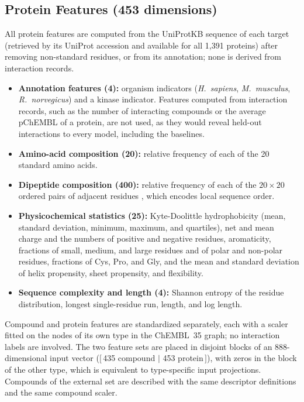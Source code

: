 \documentclass[11pt,letterpaper]{article}
\begin{document}
\subsection*{Protein Features (453 dimensions)}
All protein features are computed from the UniProtKB sequence of each target (retrieved by its UniProt accession and available for all 1{,}391 proteins) after removing non-standard residues, or from its annotation; none is derived from interaction records.
\begin{itemize}
    \item \textbf{Annotation features (4):} organism indicators (\textit{H.~sapiens}, \textit{M.~musculus}, \textit{R.~norvegicus}) and a kinase indicator. Features computed from interaction records, such as the number of interacting compounds or the average pChEMBL of a protein, are not used, as they would reveal held-out interactions to every model, including the baselines.
    \item \textbf{Amino-acid composition (20):} relative frequency of each of the 20 standard amino acids.
    \item \textbf{Dipeptide composition (400):} relative frequency of each of the $20\times 20$ ordered pairs of adjacent residues \cite{bhasin2004classification}, which encodes local sequence order.
    \item \textbf{Physicochemical statistics (25):} Kyte-Doolittle hydrophobicity (mean, standard deviation, minimum, maximum, and quartiles), net and mean charge and the numbers of positive and negative residues, aromaticity, fractions of small, medium, and large residues and of polar and non-polar residues, fractions of Cys, Pro, and Gly, and the mean and standard deviation of helix propensity, sheet propensity, and flexibility.
    \item \textbf{Sequence complexity and length (4):} Shannon entropy of the residue distribution, longest single-residue run, length, and log length.
\end{itemize}

Compound and protein features are standardized separately, each with a scaler fitted on the nodes of its own type in the ChEMBL~35 graph; no interaction labels are involved. The two feature sets are placed in disjoint blocks of an 888-dimensional input vector ($[\,$435 compound $|$ 453 protein$\,]$), with zeros in the block of the other type, which is equivalent to type-specific input projections. Compounds of the external set are described with the same descriptor definitions and the same compound scaler.
\end{document}
